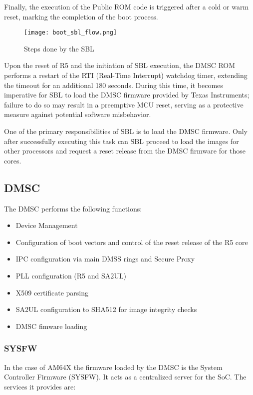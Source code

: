 Finally, the execution of the Public ROM code is triggered after a cold or warm
reset, marking the completion of the boot process.

\begin{figure}
    \centering
    \texttt{[image: boot\_sbl\_flow.png]}
    \caption{Steps done by the SBL}
\end{figure}

Upon the reset of R5 and the initiation of SBL execution, the DMSC ROM performs
a restart of the RTI (Real-Time Interrupt) watchdog timer, extending the
timeout for an additional 180 seconds.
During this time, it becomes imperative for SBL to load the DMSC firmware
provided by Texas Instruments; failure to do so may result in a preemptive MCU
reset, serving as a protective measure against potential software misbehavior.

One of the primary responsibilities of SBL is to load the DMSC firmware.
Only after successfully executing this task can SBL proceed to load the images
for other processors and request a reset release from the DMSC firmware for
those cores.

\subsection{DMSC}

The DMSC performs the following functions:

\begin{itemize}
    \item   Device Management
    \item   Configuration of boot vectors and control of the reset release
            of the R5 core
    \item   IPC configuration via main DMSS rings and Secure Proxy
    \item   PLL configuration (R5 and SA2UL)
    \item   X509 certificate parsing
    \item   SA2UL configuration to SHA512 for image integrity checks
    \item   DMSC fimware loading
\end{itemize}

\subsubsection{SYSFW}

In the case of AM64X the firmware loaded by the DMSC is the System Controller
Firmware (SYSFW). It acts as a centralized server for the SoC. The services it
provides are:

